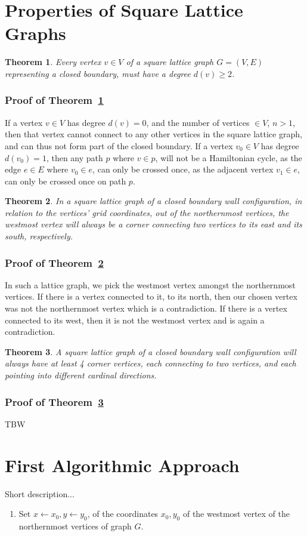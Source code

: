\documentclass[a4paper,12pt]{article}
\newtheorem{theorem}{Theorem}
\begin{document}
\section{Properties of Square Lattice Graphs}
\begin{theorem}
Every vertex $v\in V$ of a square lattice graph $G=(V,E)$ representing a closed boundary, must have a degree $d(v)\geq 2$.\label{DegreeLemma}
\end{theorem}
\subsubsection*{Proof of Theorem~\ref{DegreeLemma}}
If a vertex $v\in V$ has degree $d(v)=0$, and the number of vertices $\in V$, $n>1$, then that vertex cannot connect to any other vertices in the square lattice graph, and can thus not form part of the closed boundary. If a vertex $v_0\in V$ has degree $d(v_0)=1$, then any path $p$ where $v\in p$, will not be a Hamiltonian cycle, as the edge $e\in E$ where $v_0\in e$, can only be crossed once, as the adjacent vertex $v_1\in e$, can only be crossed once on path $p$.
\begin{theorem}
In a square lattice graph of a closed boundary wall configuration, in relation to the vertices' grid coordinates, out of the northernmost vertices, the westmost vertex will always be a corner connecting two vertices to its east and its south, respectively.\label{NorthwestCornerLemma}
\end{theorem}
\subsubsection*{Proof of Theorem~\ref{NorthwestCornerLemma}}
In such a lattice graph, we pick the westmost vertex amongst the northernmost vertices. If there is a vertex connected to it, to its north, then our chosen vertex was not the northernmost vertex which is a contradiction. If there is a vertex connected to its west, then it is not the westmost vertex and is again a contradiction. 
\begin{theorem}
A square lattice graph of a closed boundary wall configuration will always have at least 4 corner vertices, each connecting to two vertices, and each pointing into different cardinal directions.\label{FourCornerLemma}
\end{theorem}
\subsubsection*{Proof of Theorem~\ref{FourCornerLemma}}
TBW
\section{First Algorithmic Approach}
Short description...
\begin{enumerate}[1.]
\item Set $x\gets x_0, y\gets y_0$, of the coordinates $x_0,y_0$ of the westmost vertex of the northernmost vertices of graph $G$.
\end{enumerate}
\pagebreak
\nocite{*}
\printbibliography
\end{document}
